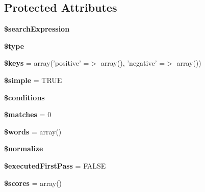\subsection*{Protected Attributes}
\begin{DoxyCompactItemize}
\item 
\hypertarget{classSearchQuery_ad0cb499ade38edaec619b28e6bc8e3ca}{
{\bfseries \$searchExpression}}
\label{classSearchQuery_ad0cb499ade38edaec619b28e6bc8e3ca}

\item 
\hypertarget{classSearchQuery_aa11cd8f3aeac111651d8d684a38abbb6}{
{\bfseries \$type}}
\label{classSearchQuery_aa11cd8f3aeac111651d8d684a38abbb6}

\item 
\hypertarget{classSearchQuery_aebeff130762baf103ec80e6f4bed456f}{
{\bfseries \$keys} = array('positive' =$>$ array(), 'negative' =$>$ array())}
\label{classSearchQuery_aebeff130762baf103ec80e6f4bed456f}

\item 
\hypertarget{classSearchQuery_a03d493c77b9827a15e94fcfc4eb04aac}{
{\bfseries \$simple} = TRUE}
\label{classSearchQuery_a03d493c77b9827a15e94fcfc4eb04aac}

\item 
\hypertarget{classSearchQuery_af4d201bc2dfe24fadefc06d823bd3e90}{
{\bfseries \$conditions}}
\label{classSearchQuery_af4d201bc2dfe24fadefc06d823bd3e90}

\item 
\hypertarget{classSearchQuery_a59772bbb73a535cd078c7c21bf8d3e11}{
{\bfseries \$matches} = 0}
\label{classSearchQuery_a59772bbb73a535cd078c7c21bf8d3e11}

\item 
\hypertarget{classSearchQuery_a0ccd9db4b8afa4d116089214e0baba7d}{
{\bfseries \$words} = array()}
\label{classSearchQuery_a0ccd9db4b8afa4d116089214e0baba7d}

\item 
\hypertarget{classSearchQuery_a6ad9a09d4f843074aa0356d1324942d9}{
{\bfseries \$normalize}}
\label{classSearchQuery_a6ad9a09d4f843074aa0356d1324942d9}

\item 
\hypertarget{classSearchQuery_a957ee8e3e0af3eb28ecca0a2b980958b}{
{\bfseries \$executedFirstPass} = FALSE}
\label{classSearchQuery_a957ee8e3e0af3eb28ecca0a2b980958b}

\item 
\hypertarget{classSearchQuery_a575979ad149528ff5b2ef10d380b22ae}{
{\bfseries \$scores} = array()}
\label{classSearchQuery_a575979ad149528ff5b2ef10d380b22ae}


\end{DoxyCompactItemize}
